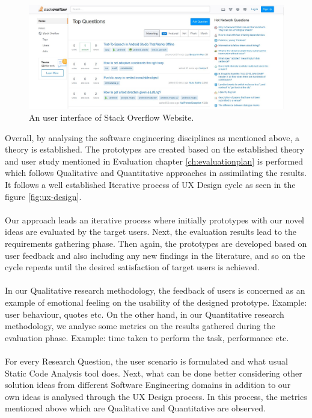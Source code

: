 \begin{figure}[hbt!]
	\centering
	\includegraphics[width=\linewidth]{figures/stackoverflow}
	\caption{An user interface of Stack Overflow Website.}
	\label{fig:stackoverflow}
\end{figure}

Overall, by analysing the software engineering disciplines as mentioned above, a theory is established. The prototypes are created based on the established theory and user study mentioned in Evaluation chapter \ref{ch:evaluationplan} is performed which follows Qualitative and Quantitative approaches in assimilating the results. It follows a well established Iterative process of UX Design \cite{UX} cycle as seen in the figure \ref{fig:ux-design}. \\ \\

Our approach leads an iterative process where initially prototypes with our novel ideas are evaluated by the target users. Next, the evaluation results lead to the requirements gathering phase. Then again, the prototypes are developed based on user feedback and also including any new findings in the literature, and so on the cycle repeats until the desired satisfaction of target users is achieved. \\ \\

In our Qualitative research methodology, the feedback of users is concerned as an example of emotional feeling on the usability of the designed prototype. Example: user behaviour, quotes etc. On the other hand, in our Quantitative research methodology, we analyse some metrics on the results gathered during the evaluation phase.  Example: time taken to perform the task, performance etc. \\ \\

For every Research Question, the user scenario is formulated and what usual Static Code Analysis tool does. Next, what can be done better considering other solution ideas from different Software Engineering domains in addition to our own ideas is analysed through the UX Design process. In this process, the metrics mentioned above which are Qualitative and Quantitative are observed.  \\ \\


